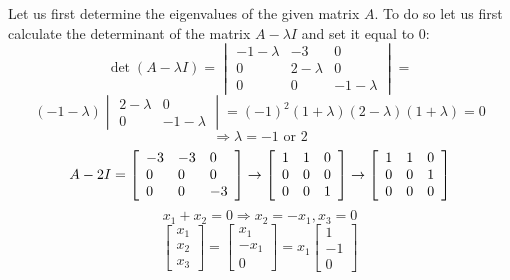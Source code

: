 \documentclass[12pt,letterpaper,reqno]{amsart}
\begin{document}
\begin{enumerate}
\begin{enumerate}
    Let us first determine the eigenvalues of the given matrix $A$. To do so let us first calculate the determinant of the matrix $A - \lambda I$ and set it equal to $0$:
    $$\det(A-\lambda I) = \begin{vmatrix} { -1 - \lambda } & { -3 } & { 0 } \\ { 0 } & { 2 - \lambda } & { 0 } \\ { 0 } & { 0 } & { -1 - \lambda } \end{vmatrix} = $$
    $$(-1- \lambda)\begin{vmatrix} { 2 - \lambda } & { 0 } \\  { 0 } & { -1 - \lambda } \end{vmatrix} = (-1)^2(1 + \lambda)(2 - \lambda)(1 + \lambda) = 0$$
    $$\Rightarrow \lambda = -1 \text{ or }2$$
    $$A-2I = \left[ \begin{array} { l l l } { -3 } & { -3 } & { 0 } \\ { 0 } & { 0 } & { 0 } \\ { 0 } & { 0 } & { -3 } \end{array} \right] \rightarrow \left[ \begin{array} { l l l } { 1 } & { 1 } & { 0 } \\ { 0 } & { 0 } & { 0 } \\ { 0 } & { 0 } & { 1 } \end{array} \right] \rightarrow \left[ \begin{array} { l l l } { 1 } & { 1 } & { 0 } \\ { 0 } & { 0 } & { 1 } \\ { 0 } & { 0 } & { 0 } \end{array} \right]$$
    $$x_1 + x_2 = 0 \Rightarrow x_2 = -x_1, x_3 = 0$$
    $$\left[ \begin{array} { l } { x_1 } \\ { x_2 } \\ { x_3 } \end{array} \right] = \left[ \begin{array} { l } { x_1 } \\ { -x_1 } \\ { 0 } \end{array} \right] = x_1 \left[ \begin{array} { l } { 1 } \\ { -1 } \\ { 0 } \end{array} \right]$$
    \newline

\end{enumerate}
\end{enumerate}
\end{document}
